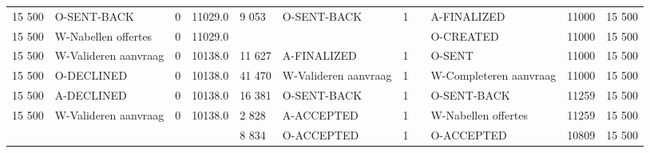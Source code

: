 \begin{tabular}{lllllllllll}
15 500 & O-SENT-BACK & 0 & 11029.0 & 9 053 & O-SENT-BACK & 1 &  & A-FINALIZED & 11000 & 15 500 \\
15 500 & W-Nabellen offertes & 0 & 11029.0 &  &  &  &  & O-CREATED & 11000 & 15 500 \\
15 500 & W-Valideren aanvraag & 0 & 10138.0 & 11 627 & A-FINALIZED & 1 &  & O-SENT & 11000 & 15 500 \\
15 500 & O-DECLINED & 0 & 10138.0 & 41 470 & W-Valideren aanvraag & 1 &  & W-Completeren aanvraag & 11000 & 15 500 \\
15 500 & A-DECLINED & 0 & 10138.0 & 16 381 & O-SENT-BACK & 1 &  & O-SENT-BACK & 11259 & 15 500 \\
15 500 & W-Valideren aanvraag & 0 & 10138.0 & 2 828 & A-ACCEPTED & 1 &  & W-Nabellen offertes & 11259 & 15 500 \\
 &  &  &  & 8 834 & O-ACCEPTED & 1 &  & O-ACCEPTED & 10809 & 15 500 \\
\bottomrule
\end{tabular}
